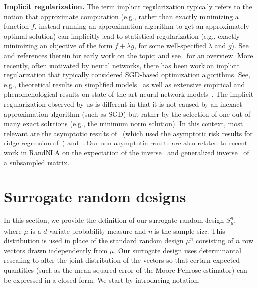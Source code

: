 \documentclass[11pt]{article}
\begin{document}
\textbf{Implicit regularization.}
The term implicit regularization typically refers to the notion that approximate
computation (e.g., rather than exactly minimizing a function $f$,
instead running an approximation algorithm to get an approximately
optimal solution) can implicitly lead to
statistical regularization (e.g., exactly minimizing an objective of
the form $f + \lambda g$, for some well-specified $\lambda$ and $g$).  
See~\cite{MO11-implementing, PM11, GM14_ICML} and references therein
for early work on the topic; and see~\cite{Mah12} for an overview. 
More recently, often motivated by neural networks, there has been work
on implicit regularization that typically considered SGD-based
optimization algorithms. 
See, e.g., theoretical results on simplified
models~\cite{NTS14_TR,Ney17_TR,SHNx17_TR,GWBNx17_TR,ACHL19_TR,KBMM19_TR}
as well as extensive empirical and phenomenological results on state-of-the-art neural
network models~\cite{MM18_TR,MM19_HTSR_ICML}.
The implicit regularization observed by us is different in that it is
not caused by an inexact approximation algorithm (such as SGD) but rather by the
selection of one out of many exact solutions (e.g., the minimum norm
solution). In this context, most relevant are the 
asymptotic results of~\cite{LJB19_TR} (which used the asymptotic risk
results for ridge regression of~\cite{DW15_TR}) and~\cite{KLS18_TR}. 
Our non-asymptotic results are also related to recent work in
RandNLA on the expectation of the
inverse~\cite{determinantal-averaging} and generalized
inverse~\cite{MDK19_TR} of a subsampled matrix. 

\section{Surrogate random designs}
\label{s:determinantal}

In this section, we provide the definition of our surrogate random
design $S_\mu^n$, where $\mu$ is a $d$-variate probability measure and
$n$ is the sample size. This distribution is used in place
of the standard random design $\mu^n$ consisting of $n$ row vectors drawn
independently from $\mu$. Our surrogate design uses determinantal
rescaling to alter the joint distribution of the vectors so that
certain expected quantities (such as the mean squared error of the
Moore-Penrose estimator) can be expressed in a closed form.
We start by introducing notation.
\end{document}
